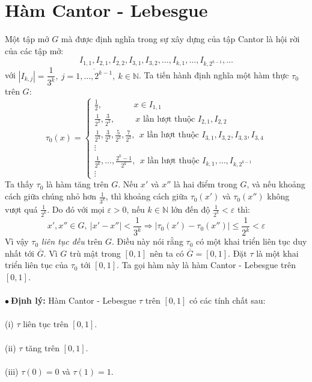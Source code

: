 \documentclass[10.5pt, a4paper]{article}
\begin{document}
\section{Hàm Cantor - Lebesgue}
Một tập mở $G$ mà được định nghĩa trong sự xây dựng của tập Cantor là hội rời của các tập mở: $$I_{1,1},I_{2,1},I_{2,2},I_{3,1},I_{3,2},\dots,I_{k,1},\dots,I_{k,2^{k-1}},\dots$$
với $|I_{k,j}|=\dfrac{1}{3^k},~j=\overline{1,\dots,2^{k-1}},~k\in\mathbb N$. Ta tiến hành định nghĩa một hàm thực $\tau_0$ trên $G$: $$\tau_0(x)=\begin{cases}
    \frac12,~~~~~~~~~~~~~~~~~x\in I_{1,1}\\
    \frac{1}{2^2},\frac{3}{2^2},~~~~~~~~~~~x\text{ lần lượt thuộc }I_{2,1},I_{2,2}\\
    \frac{1}{2^3},\frac{3}{2^3},\frac{5}{2^3},\frac{7}{2^3},~~x\text{ lần lượt thuộc }I_{3,1},I_{3,2},I_{3,3},I_{3,4}\\
    \vdots\\
    \frac{1}{2^k},\dots,\frac{2^k-1}{2^k},~~x\text{ lần lượt thuộc }I_{k,1},\dots,I_{k,2^{k-1}}\\
    \vdots
\end{cases}$$
Ta thấy $\tau_0$ là hàm tăng trên $G$. Nếu $x'$ và $x''$ là hai điểm trong $G$, và nếu khoảng cách giữa chúng nhỏ hơn $\frac{1}{3^k}$, thì khoảng cách giữa $\tau_0(x')$ và $\tau_0(x'')$ không vượt quá $\frac{1}{2^k}$. Do đó với mọi $\varepsilon>0$, nếu $k\in\mathbb N$ lớn đến độ $\frac{1}{2^k}<\varepsilon$ thì: $$x',x''\in G,~|x'-x''|<\dfrac{1}{3^k}\Rightarrow|\tau_0(x')-\tau_0(x'')|\le\dfrac{1}{2^k}<\varepsilon$$
Vì vậy $\tau_0$ \textit{liên tục đều} trên $G$. Điều này nói rằng $\tau_0$ có một khai triển liên tục duy nhất tới $\overline G$. Vì $G$ trù mật trong $[0,1]$ nên ta có $\overline G=[0,1]$. Đặt $\tau$ là một khai triển liên tục của $\tau_0$ tới $[0,1]$. Ta gọi hàm này là hàm Cantor - Lebesgue trên $[0,1]$.\\\\
$\bullet~$\textbf{Định lý:} Hàm Cantor - Lebesgue $\tau$ trên $[0,1]$ có các tính chất sau:\\\\
(i) $\tau$ liên tục trên $[0,1]$.\\\\
(ii) $\tau$ tăng trên $[0,1]$.\\\\
(iii) $\tau(0)=0$ và $\tau(1)=1$.\\\\
\end{document}
